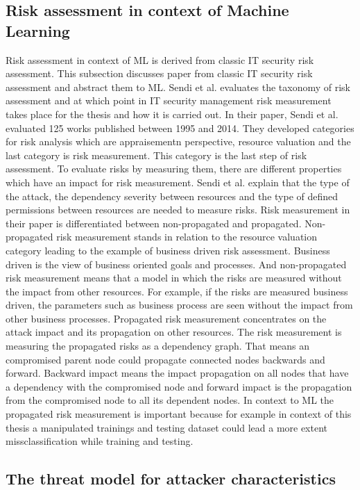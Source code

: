 \subsection{Risk assessment in context of Machine Learning}

Risk assessment in context of ML is derived from classic IT security risk assessment. This subsection discusses paper from classic IT security risk assessment and abstract them to ML. Sendi et al. \cite{DBLP:journals/compsec/SendiAC16} evaluates the taxonomy of risk assessment and at which point in IT security management risk measurement takes place for the thesis and how it is carried out. In their paper, Sendi et al. evaluated 125 works published between 1995 and 2014. They developed categories for risk analysis which are appraisementn perspective, resource valuation and the last category is risk measurement. This category is the last step of risk assessment. To evaluate risks by measuring them, there are different properties which have an impact for risk measurement. Sendi et al. explain that the type of the attack, the dependency severity between resources and the type of defined permissions between resources are needed to measure risks. Risk measurement in their paper is differentiated between non-propagated and propagated. Non-propagated risk measurement stands in relation to the resource valuation category leading to the example of business driven risk assessment. Business driven is the view of business oriented goals and processes. And non-propagated risk measurement means that a model in which the risks are measured without the impact from other resources. For example, if the risks are measured business driven, the parameters such as business process are seen without the impact from other business processes. Propagated risk measurement concentrates on the attack impact and its propagation on other resources. The risk measurement is measuring the propagated risks as a dependency graph. That means an compromised parent node could propagate connected nodes backwards and forward. Backward impact means the impact propagation on all nodes that have a dependency with the compromised node and forward impact is the propagation from the compromised node to all its dependent nodes. In context to ML the propagated risk measurement is important because for example in context of this thesis a manipulated trainings and testing dataset could lead a more extent missclassification while training and testing.

\subsection{The threat model for attacker characteristics}

